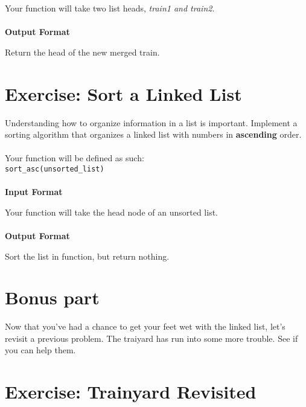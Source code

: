 \documentclass{42-en}
\begin{document}
    Your function will take two list heads, \textit{train1 and train2}.\\
    \\
    \textbf{Output Format}

    Return the head of the new merged train.

\nextexercice

\chapter{Exercise\exercicenumber: Sort a Linked List}

\exnumber{\exercicenumber}

\makeheaderfiles
    Understanding how to organize information in a list is important. Implement
    a sorting algorithm that organizes a linked list with numbers in
    \textbf{ascending} order.\\
    \\
    Your function will be defined as such:\\
    \texttt{sort\_asc(unsorted\_list)}\\
    \\
    \textbf{Input Format}

    Your function will take the head node of an unsorted list.\\
    \\
    \textbf{Output Format}

    Sort the list in function, but return nothing.

\chapter{Bonus part}
    Now that you've had a chance to get your feet wet with the linked list, let's
    revisit a previous problem. The traiyard has run into some more trouble.
    See if you can help them.


\nextexercice

\chapter{Exercise\exercicenumber: Trainyard Revisited}
\end{document}
